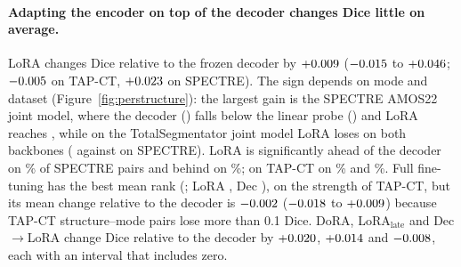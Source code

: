 \paragraph{Adapting the encoder on top of the decoder changes Dice little on average.} LoRA changes Dice relative to the frozen decoder by $+0.009$ ($-0.015$ to $+0.046$; $-0.005$ on TAP-CT, $+0.023$ on SPECTRE). The sign depends on mode and dataset (Figure~\ref{fig:perstructure}): the largest gain is the SPECTRE AMOS22 joint model, where the decoder (\numSegAmosBBSpectreJointDec{}) falls below the linear probe (\numSegAmosBBSpectreJointLin{}) and LoRA reaches \numSegAmosBBSpectreJointLora{}, while on the TotalSegmentator joint model LoRA loses on both backbones (\numSegTotalsegSpectreJointLora{} against \numSegTotalsegSpectreJointDec{} on SPECTRE). LoRA is significantly ahead of the decoder on \numSegpairedSpectreDecLoraSigbetter\% of SPECTRE pairs and behind on \numSegpairedSpectreDecLoraSigworse\%; on TAP-CT on \numSegpairedTapctDecLoraSigbetter\% and \numSegpairedTapctDecLoraSigworse\%. Full fine-tuning has the best mean rank (\numSegrankFullftMean{}; LoRA \numSegrankLoraMean{}, Dec \numSegrankDecMean{}), on the strength of TAP-CT, but its mean change relative to the decoder is $-0.002$ ($-0.018$ to $+0.009$) because \numSegdeltaTapctDecFullftDropN{} TAP-CT structure--mode pairs lose more than 0.1 Dice. DoRA, LoRA$_{\text{late}}$ and Dec$\to$LoRA change Dice relative to the decoder by $+0.020$, $+0.014$ and $-0.008$, each with an interval that includes zero.

